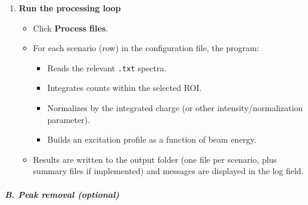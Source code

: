 \begin{enumerate}
  \begin{itemize}
  \tightlist
  \item
    If you want to keep all intermediate and final results, check
    \textbf{Save results} and choose an output folder.\\
  \item
    If not checked, the program uses an internal temporary directory for
    the session.
  \end{itemize}
\item
  \textbf{Run the processing loop}

  \begin{itemize}
  \tightlist
  \item
    Click \textbf{Process files}.\\
  \item
    For each scenario (row) in the configuration file, the program:

    \begin{itemize}
    \tightlist
    \item
      Reads the relevant \texttt{.txt} spectra.\\
    \item
      Integrates counts within the selected ROI.\\
    \item
      Normalizes by the integrated charge (or other
      intensity/normalization parameter).\\
    \item
      Builds an excitation profile as a function of beam energy.\\
    \end{itemize}
  \item
    Results are written to the output folder (one file per scenario,
    plus summary files if implemented) and messages are displayed in the
    log field.
  \end{itemize}
\end{enumerate}

\hypertarget{b.-peak-removal-optional}{%
\subparagraph{B. Peak removal
(optional)}\label{b.-peak-removal-optional}}

